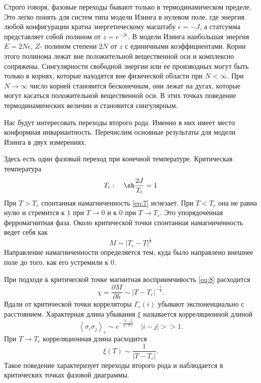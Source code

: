 \documentclass[a4paper,12pt]{article}
\theoremstyle{definition}
\theoremstyle{definition}
\theoremstyle{definition}
\begin{document}
Строго говоря, фазовые переходы бывают только в термодинамическом пределе. Это легко понять для систем типа модели Изинга в нулевом поле, где энергия любой конфигурации кратна энергетическому масштабу $\epsilon=-J$, а статсумма представляет собой полином от $z=e^{-\beta\epsilon}$. В модели Изинга наибольшая энергия $E=2N\epsilon$, $Z$- полином степени $2N$ от $z$ с единичными коэффициентами. Корни этого полинома лежат вне положительной вещественной оси и комплексно сопряжены. Сингулярности свободной энергии или ее производных могут быть только в корнях, которые находятся вне физической области при $N<\infty$. При $N\to \infty$ число корней становится бесконечным, они лежат на дугах, которые могут касаться положительной вещественной оси. В этих точках поведение термодинамических величин и становится сингулярным.

Нас будут интересовать переходы второго рода. Именно в них имеет место конформная инвариантность. 
Перечислим основные результаты для модели Изинга в двух измерениях.

Здесь есть один фазовый переход при конечной температуре. 
Критическая температура
\begin{equation}
  \label{eq:27}
  T_c:\quad \sh \frac{2J}{T_c}=1
\end{equation}
При $T>T_c$ спонтанная намагниченность \eqref{eq:7} исчезает. При $T<T_c$ она не равна нулю и стремится к $1$ при $T\to 0$ и к $0$ при $T\to T_c$. Это упорядоченная ферромагнитная фаза. Около критической точки спонтанная намагниченность ведет себя как
\begin{equation}
  \label{eq:28}
  M\sim \left|T_c-T\right|^{\frac{1}{8}}
\end{equation}
Направление намагниченности определяется тем, куда было направлено внешнее поле до того, как его устремили к $0$. 

При подходе к критической точке магнитная восприимчивость \eqref{eq:8} расходится
\begin{equation}
  \label{eq:29}
  \chi=\frac{\partial M}{\partial h}\sim \left|T-T_c \right|^{-\frac{7}{4}}.
\end{equation}
Вдали от критической точки корреляторы $\Gamma_c(i)$ убывают экспоненциально с расстоянием. Характерная длина убывания $\xi$ называется корреляционной длиной
\begin{equation}
  \label{eq:30}
  \left<\sigma_i\sigma_j\right>_c\sim e^{-\frac{\left|i-j\right|}{\xi(T)}}\quad \left|i-j\right|>>1.
\end{equation}
При $T\to T_c$ корреляционная длина расходится
\begin{equation}
  \label{eq:31}
  \xi(T)\sim \frac{1}{\left|T-T_c\right|}.
\end{equation}
Такое поведение характеризует переходы второго рода и наблюдается в критических точках фазовой диаграммы.
\end{document}
